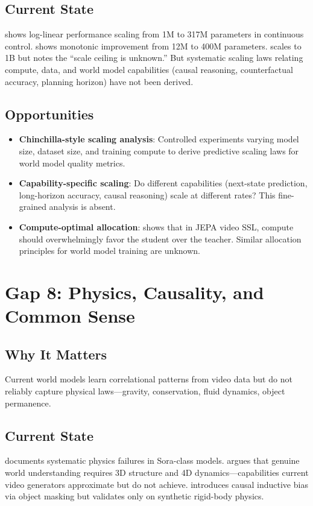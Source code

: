 \documentclass[11pt,a4paper]{article}
\begin{document}
\subsection{Current State}
\citet{hansen2024tdmpc2} shows log-linear performance scaling from 1M to 317M parameters in continuous control. \citet{hafner2023dreamerv3} shows monotonic improvement from 12M to 400M parameters. \citet{assran2025vjepa2} scales to 1B but notes the ``scale ceiling is unknown.'' But systematic scaling laws relating compute, data, and world model capabilities (causal reasoning, counterfactual accuracy, planning horizon) have not been derived.

\subsection{Opportunities}
\begin{itemize}[noitemsep]
    \item \textbf{Chinchilla-style scaling analysis}: Controlled experiments varying model size, dataset size, and training compute to derive predictive scaling laws for world model quality metrics.
    \item \textbf{Capability-specific scaling}: Do different capabilities (next-state prediction, long-horizon accuracy, causal reasoning) scale at different rates? This fine-grained analysis is absent.
    \item \textbf{Compute-optimal allocation}: \citet{li2025rethinking} shows that in JEPA video SSL, compute should overwhelmingly favor the student over the teacher. Similar allocation principles for world model training are unknown.
\end{itemize}

\section{Gap 8: Physics, Causality, and Common Sense}

\subsection{Why It Matters}
Current world models learn correlational patterns from video data but do not reliably capture physical laws---gravity, conservation, fluid dynamics, object permanence.

\subsection{Current State}
\citet{ding2024understanding} documents systematic physics failures in Sora-class models. \citet{kong2025survey3d4d} argues that genuine world understanding requires 3D structure and 4D dynamics---capabilities current video generators approximate but do not achieve. \citet{nam2026causaljepa} introduces causal inductive bias via object masking but validates only on synthetic rigid-body physics.
\end{document}
